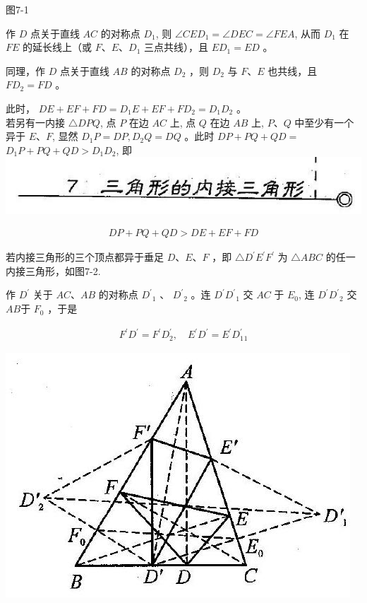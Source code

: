 \documentclass[10pt]{article}
\begin{document}
图7-1

作 $D$ 点关于直线 $A C$ 的对称点 $D_{1}$, 则 $\angle C E D_{1}=\angle D E C=\angle F E A$, 从而 $D_{1}$ 在 $F E$ 的延长线上（或 $F 、 E 、 D_{1}$ 三点共线），且 $E D_{1}=E D$ 。

同理，作 $D$ 点关于直线 $A B$ 的对称点 $D_{2}$ ，则 $D_{2}$ 与 $F 、 E$ 也共线，且 $F D_{2}=F D$ 。

此时， $D E+E F+F D=D_{1} E+E F+F D_{2}=D_{1} D_{2}$ 。\\
若另有一内接 $\triangle D P Q$, 点 $P$ 在边 $A C$ 上, 点 $Q$ 在边 $A B$ 上, $P 、 Q$ 中至少有一个异于 $E 、 F$, 显然 $D_{1} P=D P, D_{2} Q=D Q$ 。此时 $D P+P Q+Q D=$ $D_{1} P+P Q+Q D>D_{1} D_{2}$, 即\\
\includegraphics[max width=\textwidth, center]{2024_10_30_2c8f45efd4a519b08e1ag-075(2)}

\begin{align*}
D P+P Q+Q D>D E+E F+F D
\end{align*}

若内接三角形的三个顶点都异于垂足 $D 、 E 、 F$ ，即 $\triangle D^{\prime} E^{\prime} F^{\prime}$ 为 $\triangle A B C$ 的任一内接三角形，如图7-2.

作 $D^{\prime}$ 关于 $A C 、 A B$ 的对称点 $D^{\prime}{ }_{1}$ 、 $D^{\prime}{ }_{2}$ 。连 $D^{\prime} D^{\prime}{ }_{1}$ 交 $A C$ 于 $E_{0}$, 连 $D^{\prime} D^{\prime}{ }_{2}$ 交 $A B$于 $F_{0}$ ，于是

\begin{align*}
F^{\prime} D^{\prime}=F^{\prime} D_{2}^{\prime}, \quad E^{\prime} D^{\prime}=E^{\prime} D_{1}^{\prime}{ }_{1}
\end{align*}

\begin{center}
\includegraphics[max width=\textwidth]{2024_10_30_2c8f45efd4a519b08e1ag-076(1)}
\end{center}
\end{document}
